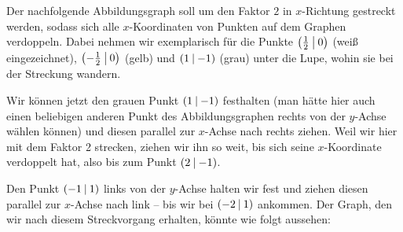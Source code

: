 \documentclass[../../main.tex]{subfiles}
\begin{document}
\begin{example}{}
   Der nachfolgende Abbildungsgraph soll um den Faktor $2$ in $x$-Richtung gestreckt werden, sodass sich alle $x$-Koordinaten von Punkten auf dem Graphen verdoppeln. Dabei nehmen wir exemplarisch für die Punkte $\left(\frac{1}{2} \:\middle|\: 0\right)$ (weiß eingezeichnet), $\left(-\frac{1}{2} \:\middle|\: 0\right)$ (gelb) und $\left(1 \:\middle|\: -1\right)$ (grau) unter die Lupe, wohin sie bei der Streckung wandern.
   \begin{center}
    \end{center}
    
    Wir können jetzt den grauen Punkt $\left(1 \:\middle|\: -1\right)$ festhalten (man hätte hier auch einen beliebigen anderen Punkt des Abbildungsgraphen rechts von der $y$-Achse wählen können) und diesen parallel zur $x$-Achse nach rechts ziehen. Weil wir hier mit dem Faktor 2 strecken, ziehen wir ihn so weit, bis sich seine $x$-Koordinate verdoppelt hat, also bis zum Punkt $\left(2 \:\middle|\: -1\right)$.
    
    Den Punkt $\left(-1 \:\middle|\: 1\right)$ links von der $y$-Achse halten wir fest und ziehen diesen parallel zur $x$-Achse nach link -- bis wir bei $\left(-2 \:\middle|\: 1\right)$ ankommen. Der Graph, den wir nach diesem Streckvorgang erhalten, könnte wie folgt aussehen:
    
    \begin{center}
    \end{center}
    

\end{example}
\end{document}
